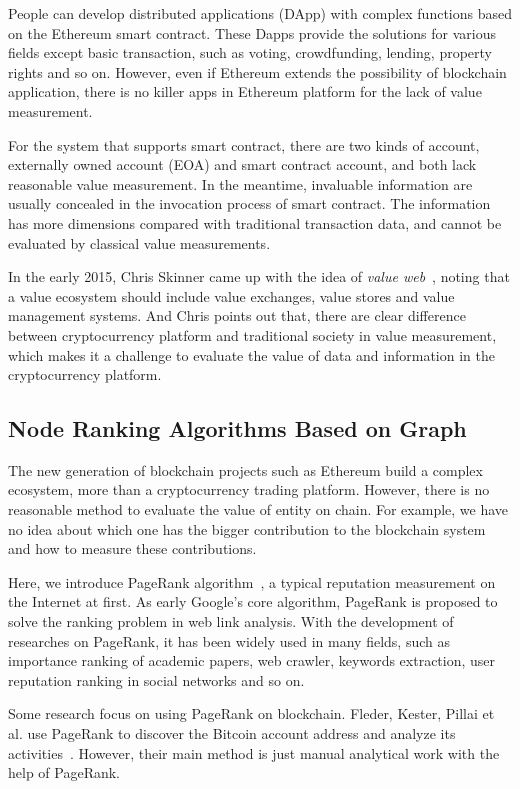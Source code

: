 People can develop distributed applications (DApp) with complex functions based on the Ethereum smart contract. These Dapps provide the solutions for various fields except basic transaction, such as voting, crowdfunding, lending, property rights and so on.
However, even if Ethereum extends the possibility of blockchain application, there is no killer apps in Ethereum platform for the lack of value measurement.

For the system that supports smart contract, there are two kinds of account, externally owned account (EOA) and smart contract account, and both lack reasonable value measurement. In the meantime, invaluable information are usually concealed in the invocation process of smart contract. The information has more dimensions compared with traditional transaction data, and cannot be evaluated by classical value measurements.

In the early 2015, Chris Skinner came up with the idea of \emph{value web}~\cite{ChrisSkinner}, noting that a value ecosystem should include value exchanges, value stores and value management systems. And Chris points out that, there are clear difference between cryptocurrency platform and traditional society in value measurement, which makes it a challenge to evaluate the value of data and information in the cryptocurrency platform.

\subsection{Node Ranking Algorithms Based on Graph}
The new generation of blockchain projects such as Ethereum build a complex ecosystem, more than a cryptocurrency trading platform. However, there is no reasonable method to evaluate the value of entity on chain. For example, we have no idea about which one has the bigger contribution to the blockchain system and how to measure these contributions.

Here, we introduce PageRank algorithm~\cite{page1999pagerank}, a typical reputation measurement on the Internet at first. As early Google's core algorithm, PageRank is proposed to solve the ranking problem in web link analysis. With the development of researches on PageRank, it has been widely used in many fields, such as importance ranking of academic papers, web crawler, keywords extraction, user reputation ranking in social networks and so on.

Some research focus on using PageRank on blockchain. Fleder, Kester, Pillai et al. use PageRank to discover the Bitcoin account address and analyze its activities~\cite{Fleder2015}. However, their main method is just manual analytical work with the help of PageRank.

